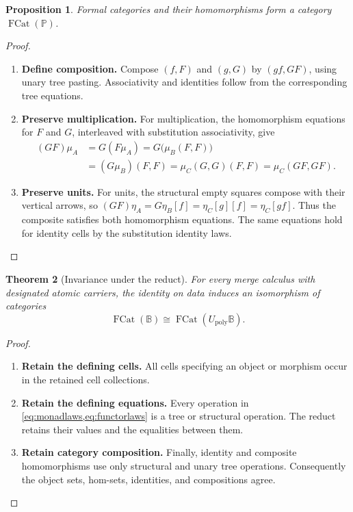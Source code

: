 \documentclass[11pt,reqno]{amsart}
\theoremstyle{plain}
\newtheorem{theorem}{Theorem}[section]
\newtheorem{proposition}[theorem]{Proposition}
\theoremstyle{definition}
\theoremstyle{remark}
\numberwithin{equation}{section}
\newcommand{\Pcal}{\mathbb P}
\newcommand{\Bcal}{\mathbb B}
\newcommand{\Up}{U_{\mathrm{poly}}}
\newcommand{\FCat}{\operatorname{FCat}}
\begin{document}
\begin{proposition}\label{prop:cat}
Formal categories and their homomorphisms form a category $\FCat(\Pcal)$.
\end{proposition}
\begin{proof}\leavevmode
\begin{enumerate}
\item \textbf{Define composition.} Compose $(f,F)$ and $(g,G)$ by $(gf,GF)$, using unary tree pasting.
Associativity and identities follow from the corresponding tree equations.

\item \textbf{Preserve multiplication.} For multiplication, the homomorphism equations for $F$ and $G$,
interleaved with substitution associativity, give
\begin{align*}
 (GF)\mu_A
 &=G(F\mu_A)=G\bigl(\mu_B(F,F)\bigr)\\
 &=(G\mu_B)(F,F)=\mu_C(G,G)(F,F)
   =\mu_C(GF,GF).
\end{align*}

\item \textbf{Preserve units.} For units, the structural empty squares compose with their vertical
arrows, so
$(GF)\eta_A=G\eta_B[f]=\eta_C[g][f]=\eta_C[gf]$.
Thus the composite satisfies both homomorphism equations. The same
equations hold for identity cells by the substitution identity laws.\qedhere
\end{enumerate}
\end{proof}

\begin{theorem}[Invariance under the reduct]\label{thm:reduct}
For every merge calculus with designated atomic carriers, the identity on
data induces an isomorphism of categories
\[
 \FCat(\Bcal)\cong\FCat(\Up\Bcal).
\]
\end{theorem}
\begin{proof}\leavevmode
\begin{enumerate}
\item \textbf{Retain the defining cells.} All cells specifying an object or morphism occur in the retained cell
collections.

\item \textbf{Retain the defining equations.} Every operation in \cref{eq:monadlaws,eq:functorlaws} is a
tree or structural operation. The reduct retains their values and the
equalities between them.

\item \textbf{Retain category composition.} Finally, identity and composite homomorphisms use
only structural and unary tree operations. Consequently the object sets,
hom-sets, identities, and compositions agree.\qedhere
\end{enumerate}
\end{proof}
\end{document}
